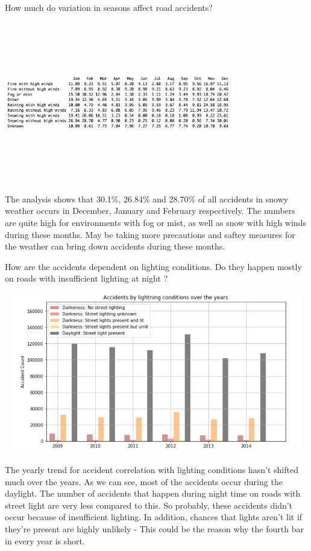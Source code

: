 \documentclass[a4paper, 10pt]{article}
\begin{document}
   How much do variation in seasons affect road accidents? 

   \begin{center}
     \includegraphics[width=10cm,height=7cm, scale=0.7,keepaspectratio]{seasonal-study.png}
   \end{center}

   The analysis shows that 30.1\%, 26.84\% and 28.70\% of all accidents in snowy weather occurs in December, January and February respectively. The numbers are quite high for environments with
   fog or mist, as well as snow with high winds during these months. May be taking more precautions and saftey measures for the weather can bring down accidents during these months.

   How are the accidents dependent on lighting conditions. Do they happen mostly on roads with insufficient lighting at night ?
   
   \begin{center}
     \includegraphics[width=70cm,height=7cm, scale=0.4,keepaspectratio]{lighting-study.png}
   \end{center}
   The yearly trend for accident correlation with lighting conditions hasn't shifted much over the years. As we can see, most of the accidents occur during the daylight. The number of accidents that happen during night time on roads with street light are very less compared to this. So probably, these accidents didn't occur because of insufficient lighting. In addition, chances that lights aren't lit if they're present are highly unlikely - This could be the reason why the fourth bar in every year is short. 
\end{document}
